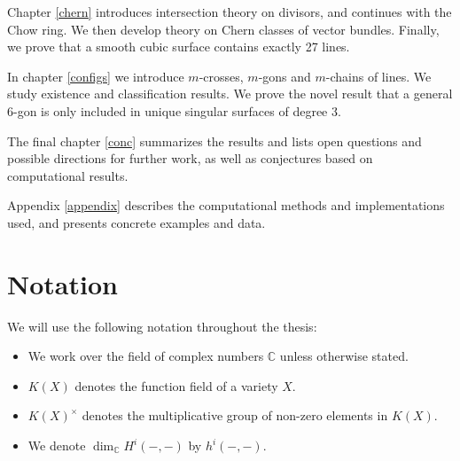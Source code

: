 Chapter \ref{chern} introduces intersection theory on divisors, and continues with the Chow ring. We then develop theory on Chern classes of vector bundles. Finally, we prove that a smooth cubic surface contains exactly 27 lines.

In chapter \ref{configs} we introduce $m$-crosses, $m$-gons and $m$-chains of lines. We study existence and classification results. We prove the novel result that a general 6-gon is only included in unique singular surfaces of degree 3. 

The final chapter \ref{conc} summarizes the results and lists open questions and possible directions for further work, as well as conjectures based on computational results.

Appendix \ref{appendix} describes the computational methods and implementations used, and presents concrete examples and data.





\section{Notation}

We will use the following notation throughout the thesis:
\begin{itemize}
    \item We work over the field of complex numbers $\mathbb{C}$ unless otherwise stated.
    \item $K(X)$ denotes the function field of a variety $X$.
    \item $K(X)^\times$ denotes the multiplicative group of non-zero elements in $K(X)$.
    \item We denote $\dim_\mathbb{C} H^i(-,-)$ by $h^i(-,-)$.
\end{itemize}
